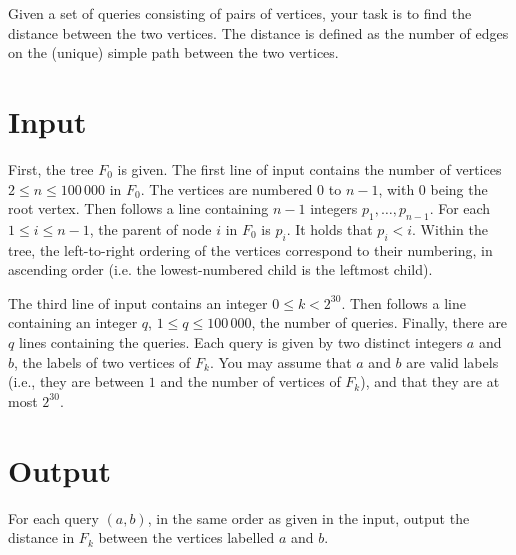 \noindent
Given a set of queries consisting of pairs of vertices, your task is to find the distance between the two vertices.
The distance is defined as the number of edges on the (unique) simple path between the two vertices.

\section*{Input}
First, the tree $F_0$ is given.
The first line of input contains the number of vertices $2 \le n \le 100\,000$ in $F_0$.
The vertices are numbered $0$ to $n - 1$, with $0$ being the root vertex.
Then follows a line containing $n-1$ integers $p_1, \ldots, p_{n-1}$.  For each $1 \le i \le n-1$, the parent of node $i$ in $F_0$ is $p_i$.
It holds that $p_i < i$.
Within the tree, the left-to-right ordering of the vertices correspond to their numbering, in ascending order (i.e. the lowest-numbered child is the leftmost child).

The third line of input contains an integer $0 \le k < 2^{30}$.
Then follows a line containing an integer $q$, $1 \le q \le 100\,000$,
the number of queries.  Finally, there are $q$ lines containing the
queries.  Each query is given by two distinct integers $a$ and $b$, the labels
of two vertices of $F_k$.  You may assume that $a$ and $b$ are valid
labels (i.e., they are between $1$ and the number of vertices of
$F_k$), and that they are at most $2^{30}$.

\section*{Output}

For each query $(a, b)$, in the same order as given in the input, output the distance in $F_k$ between the vertices labelled $a$ and $b$.
